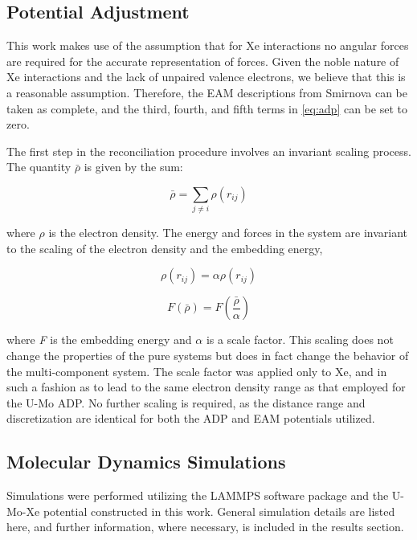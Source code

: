 \documentclass[review]{elsarticle}
\begin{document}
 \subsection{Potential Adjustment}

This work makes use of the assumption that for Xe interactions no angular forces are required for the accurate representation of forces. Given the noble nature of Xe interactions and the lack of unpaired valence electrons, we believe that this is a reasonable assumption. Therefore, the EAM descriptions from Smirnova \cite{smirnovaUMoXe} can be taken as complete, and the third, fourth, and fifth terms in \cref{eq:adp} can be set to zero. 

The first step in the reconciliation procedure involves an invariant scaling process. The quantity $\bar{\rho}$ is given by the sum:

\begin{equation}
\bar{\rho} = \sum_{j \neq i} \rho(r_{ij})
\end{equation}

\noindent where $\rho$ is the electron density. The energy and forces in the system are invariant to the scaling of the electron density and the embedding energy,

\begin{equation}
\rho(r_{ij}) = \alpha\rho(r_{ij})
\end{equation}

\begin{equation}
F(\bar{\rho}) = F(\frac{\bar{\rho}}{\alpha}) 
\end{equation}

\noindent where \textit{F} is the embedding energy and $\alpha$ is a scale factor. This scaling does not change the properties of the pure systems but does in fact change the behavior of the multi-component system. The scale factor was applied only to Xe, and in such a fashion as to lead to the same electron density range as that employed for the U-Mo ADP. No further scaling is required, as the distance range and discretization are identical for both the ADP and EAM potentials utilized. 

\subsection{Molecular Dynamics Simulations}

Simulations were performed utilizing the LAMMPS \cite{plimpton1995} software package and the U-Mo-Xe potential constructed in this work. General simulation details are listed here, and further information, where necessary, is included in the results section. 
\end{document}
